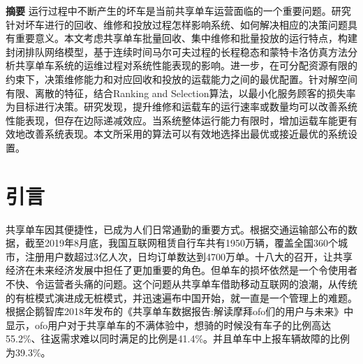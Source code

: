 \documentclass{article}
\begin{document}
\textbf{摘要}
运行过程中不断产生的坏车是当前共享单车运营面临的一个重要问题。研究针对坏车进行的回收、维修和投放过程怎样影响系统、如何解决相应的决策问题具有重要意义。本文考虑共享单车批量回收、集中维修和批量投放的运行特点，构建封闭排队网络模型，基于连续时间马尔可夫过程的长程稳态和蒙特卡洛仿真方法分析共享单车系统的运维过程对系统性能表现的影响。进一步，在可分配资源有限的约束下，决策维修能力和对应回收和投放的运载能力之间的最优配置。针对解空间有限、离散的特征，结合Ranking and Selection算法，以最小化服务顾客的损失率为目标进行决策。研究发现，提升维修和运载车的运行速率或数量均可以改善系统性能表现，但存在边际递减效应。当系统整体运行能力有限时，增加运载车能更有效地改善系统表现。本文所采用的算法可以有效地选择出最优或接近最优的系统设置。

\newpage

\section{引言}

共享单车因其便捷性，已成为人们日常通勤的重要方式。根据交通运输部公布的数据，截至2019年8月底，我国互联网租赁自行车共有1950万辆，覆盖全国360个城市，注册用户数超过3亿人次，日均订单数达到4700万单\cite{中国共享出行发展报告}。十八大的召开，让共享经济在未来经济发展中担任了更加重要的角色。但单车的损坏依然是一个令使用者不快、令运营者头痛的问题。这个问题从共享单车借助移动互联网的浪潮，从传统的有桩模式演进成无桩模式，并迅速遍布中国开始，就一直是一个管理上的难题。根据企鹅智库2018年发布的《共享单车数据报告:解读摩拜ofo们的用户与未来》中显示，ofo用户对于共享单车的不满体验中，想骑的时候没有车子的比例高达55.2\%、往返需求难以同时满足的比例是41.4\%。并且单车中上报车辆故障的比例为39.3\%。
\end{document}
